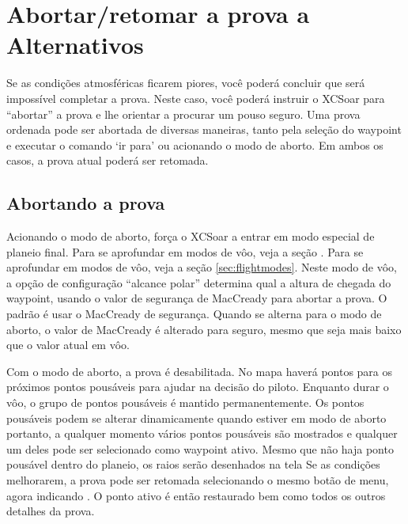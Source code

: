 

\section{Abortar/retomar a prova a Alternativos}

Se as condições atmosféricas ficarem piores, você poderá concluir que será impossível completar a prova.  Neste caso, você poderá instruir o XCSoar para “abortar” a prova e lhe orientar a procurar um pouso seguro.  Uma prova ordenada pode ser abortada de diversas maneiras, tanto pela seleção do waypoint e executar o comando ‘ir para’ ou acionando o modo de aborto.  Em ambos os casos, a prova atual poderá ser retomada.

\subsection*{Abortando a prova}\label{sec:taskabort}
Acionando o modo de aborto, força o XCSoar a entrar em modo especial de planeio final.  Para se aprofundar em modos de vôo, veja a seção .  Para se aprofundar em modos de vôo, veja a seção  \ref{sec:flightmodes}. Neste modo de vôo, a opção de configuração “alcance polar” determina qual a altura de chegada do waypoint, usando o valor de segurança de MacCready para abortar a prova.  O padrão é usar o MacCready de segurança.  Quando se alterna para o modo de aborto, o valor de MacCready é alterado para seguro, mesmo que seja mais baixo que o valor atual em vôo.

Com o modo de aborto, a prova é desabilitada.  No mapa haverá pontos para os próximos pontos pousáveis para ajudar na decisão do piloto.  Enquanto durar o vôo, o grupo de pontos pousáveis é mantido permanentemente.  Os pontos pousáveis podem se alterar dinamicamente quando estiver em modo de aborto portanto, a qualquer momento vários pontos pousáveis são mostrados e qualquer um deles pode ser selecionado como waypoint ativo.  Mesmo que não haja ponto pousável dentro do planeio, os raios serão desenhados na tela
Se as condições melhorarem, a prova pode ser retomada selecionando o mesmo botão de menu, agora indicando . O ponto ativo é então restaurado bem como todos os outros detalhes da prova.

